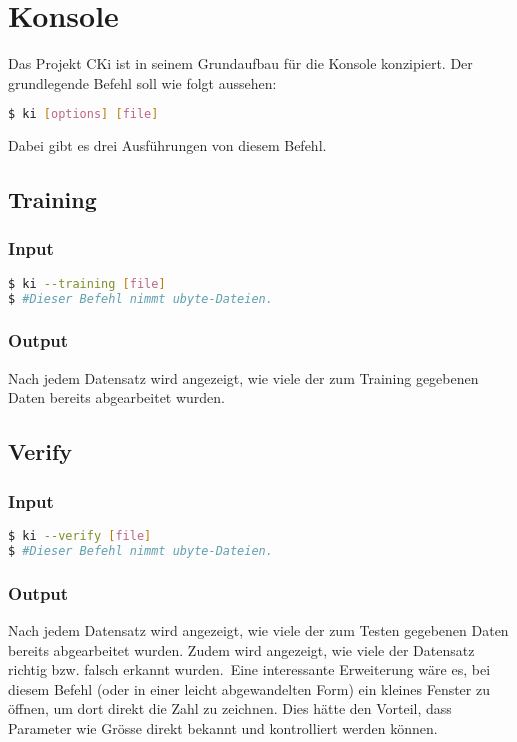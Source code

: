 \section{Konsole}
\label{sec:DesignKonsole}
Das Projekt CKi ist in seinem Grundaufbau für die Konsole konzipiert. Der grundlegende Befehl soll wie folgt aussehen: 
\begin{lstlisting}[language=bash]
$ ki [options] [file]
\end{lstlisting}
Dabei gibt es drei Ausführungen von diesem Befehl.

\subsection{Training}
\label{sec:DesignTraining}
\subsubsection{Input}
\label{sec:DesignTraiInput}
\begin{lstlisting}[language=bash]
$ ki --training [file]
$ #Dieser Befehl nimmt ubyte-Dateien.
\end{lstlisting}

\subsubsection{Output}
\label{sec:TraiOutput}
Nach jedem Datensatz wird angezeigt, wie viele der zum Training gegebenen Daten bereits abgearbeitet wurden. 

\subsection{Verify}
\label{sec:DesignTest}
\subsubsection{Input}
\label{sec:DesignTestInput}
\begin{lstlisting}[language=bash]
$ ki --verify [file]
$ #Dieser Befehl nimmt ubyte-Dateien.
\end{lstlisting}

\subsubsection{Output}
\label{sec:TestOutput}
Nach jedem Datensatz wird angezeigt, wie viele der zum Testen gegebenen Daten bereits abgearbeitet wurden. Zudem wird angezeigt, wie viele der Datensatz richtig bzw. falsch erkannt wurden.\
Eine interessante Erweiterung wäre es, bei diesem Befehl (oder in einer leicht abgewandelten Form) ein kleines Fenster zu öffnen, um dort direkt die Zahl zu zeichnen. Dies hätte den Vorteil, dass Parameter wie Grösse direkt bekannt und kontrolliert werden können.

